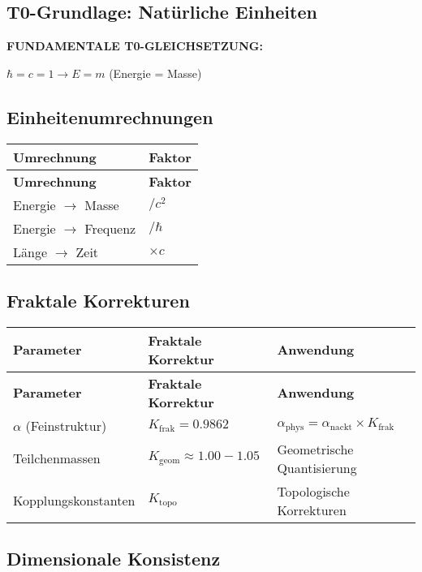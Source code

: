 \documentclass[12pt,a4paper]{article}
\begin{document}
	\subsection{T0-Grundlage: Natürliche Einheiten}
	
	\textbf{FUNDAMENTALE T0-GLEICHSETZUNG:}
	\begin{center}
		\(\hbar = c = 1 \rightarrow E = m\) (Energie = Masse)
	\end{center}
	
	\subsection{Einheitenumrechnungen}
	
	\begin{longtable}{|p{3cm}|p{3cm}|}
		\hline
		\textbf{Umrechnung} & \textbf{Faktor} \\
		\hline
		\endfirsthead
		\hline
		\textbf{Umrechnung} & \textbf{Faktor} \\
		\hline
		\endhead
		Energie \(\rightarrow\) Masse & \(/c^{2}\) \\
		\hline
		Energie \(\rightarrow\) Frequenz & \(/\hbar\) \\
		\hline
		Länge \(\rightarrow\) Zeit & \(\times c\) \\
		\hline
	\end{longtable}
	
	\subsection{Fraktale Korrekturen}
	
	\begin{longtable}{|p{4cm}|p{4cm}|p{5cm}|}
		\hline
		\textbf{Parameter} & \textbf{Fraktale Korrektur} & \textbf{Anwendung} \\
		\hline
		\endfirsthead
		\hline
		\textbf{Parameter} & \textbf{Fraktale Korrektur} & \textbf{Anwendung} \\
		\hline
		\endhead
		\(\alpha\) (Feinstruktur) & \(K_{\text{frak}} = 0.9862\) & \(\alpha_{\text{phys}} = \alpha_{\text{nackt}} \times K_{\text{frak}}\) \\
		\hline
		Teilchenmassen & \(K_{\text{geom}} \approx 1.00-1.05\) & Geometrische Quantisierung \\
		\hline
		Kopplungskonstanten & \(K_{\text{topo}}\) & Topologische Korrekturen \\
		\hline
	\end{longtable}
	
	\subsection{Dimensionale Konsistenz}
	
\end{document}
